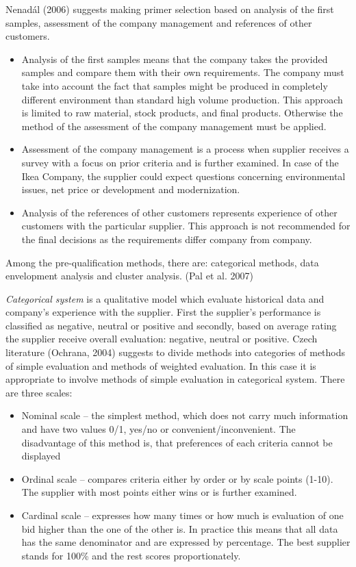 \documentclass[oneside,12pt]{article}%
\begin{document}
Nenad\'{a}l (2006) suggests making primer selection based on analysis of the first samples, assessment of the company management and references of other customers.
\begin{itemize}
  \item Analysis of the first samples means that the company takes the provided samples and compare them with their own requirements. The company must take into account the fact that samples might be produced in completely different environment than standard high volume production. This approach is limited to raw material, stock products, and final products. Otherwise the method of the assessment of the company management must be applied.
  \item Assessment of the company management is a process when supplier receives a survey with a focus on prior criteria and is further examined. In case of the Ikea Company, the supplier could expect questions concerning environmental issues, net price or development and modernization.
  \item Analysis of the references of other customers represents experience of other customers with the particular supplier. This approach is not recommended for the final decisions as the requirements differ company from company.

\end{itemize}


Among the pre-qualification methods, there are: categorical methods, data envelopment analysis and cluster analysis. (Pal et al. 2007) \par
\emph{Categorical system} is a qualitative model which evaluate historical data and company’s experience with the supplier. First the supplier’s performance is classified as negative, neutral or positive and secondly, based on average rating the supplier receive overall evaluation: negative, neutral or positive. Czech literature (Ochrana, 2004) suggests to divide methods into categories of methods of simple evaluation and methods of weighted evaluation. In this case it is appropriate to involve methods of simple evaluation in categorical system. There are three scales:
\begin{itemize}
\item Nominal scale – the simplest method, which does not carry much information and have two values 0/1, yes/no or convenient/inconvenient. The disadvantage of this method is, that preferences of each criteria cannot be displayed
\item Ordinal scale – compares criteria either by order or by scale points (1-10). The supplier with most points either wins or is further examined.
\item Cardinal scale – expresses how many times or how much is evaluation of one bid higher than the one of the other is. In practice this means that all data has the same denominator and are expressed by percentage. The best supplier stands for 100\% and the rest scores proportionately.
\end{itemize}
\end{document}
